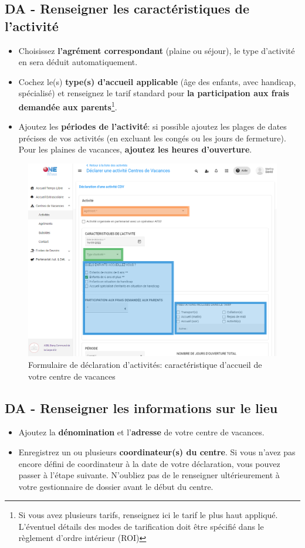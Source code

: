 \subsection{DA - Renseigner les caractéristiques de l'activité}
\begin{itemize}
    \item Choisissez \textbf{l'agrément correspondant} (plaine ou séjour), le type d'activité en sera déduit automatiquement.
    \item Cochez le(s) \textbf{type(s) d'accueil applicable} (âge des enfants, avec handicap, spécialisé) et renseignez le tarif standard pour  \textbf{la participation aux frais demandée aux parents}\footnote{Si vous avez plusieurs tarifs, renseignez ici le tarif le plus haut appliqué. L'éventuel détails des modes de tarification doit être spécifié dans le règlement d'ordre intérieur (ROI)}.
    \item Ajoutez les \textbf{périodes de l'activité}: si possible ajoutez les plages de dates précises de vos activités (en excluant les congés ou les jours de fermeture). Pour les plaines de vacances, \textbf{ajoutez les heures d'ouverture}.
\end{itemize} 

\begin{figure}[ht]
    \centering
    \includegraphics[width=12cm]{Images/cdv/da-acti.png}
    \caption{Formulaire de déclaration d'activités: caractéristique d'accueil de votre centre de vacances}
    \label{fig:cdv_da}
\end{figure}


\subsection{DA - Renseigner les informations sur le lieu}
\begin{itemize}
    \item Ajoutez la \textbf{dénomination} et l'\textbf{adresse} de votre centre de vacances.
    \item Enregistrez un ou plusieurs \textbf{coordinateur(s) du centre}. Si vous n'avez pas encore défini de coordinateur à la date de votre déclaration, vous pouvez passer à l'étape suivante. N'oubliez pas de le renseigner ultérieurement à votre gestionnaire de dossier avant le début du centre. 
\end{itemize}


